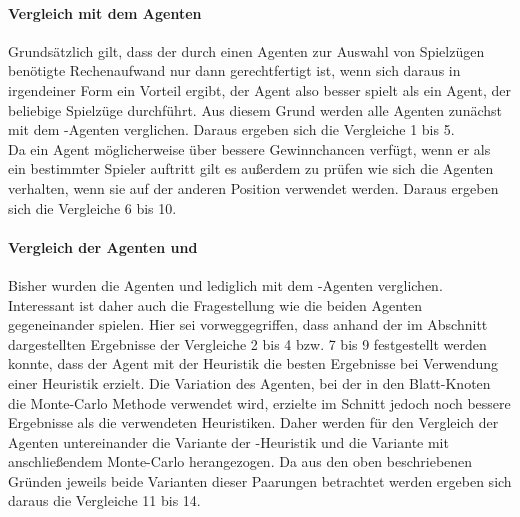 \paragraph{Vergleich mit dem Agenten }
Grundsätzlich gilt, dass der durch einen Agenten zur Auswahl von Spielzügen benötigte Rechenaufwand nur dann gerechtfertigt ist, wenn sich daraus in irgendeiner Form ein Vorteil ergibt, der Agent also besser spielt als ein Agent, der beliebige Spielzüge durchführt. Aus diesem Grund werden alle Agenten zunächst mit dem -Agenten verglichen. Daraus ergeben sich die Vergleiche 1 bis 5.
\\Da ein Agent möglicherweise über bessere Gewinnchancen verfügt, wenn er als ein bestimmter Spieler auftritt gilt es außerdem zu prüfen wie sich die Agenten verhalten, wenn sie auf der anderen Position verwendet werden. Daraus ergeben sich die Vergleiche 6 bis 10. 

\paragraph{Vergleich der Agenten \mxZitat{\abp} und }
Bisher wurden die Agenten \mxZitat{\abp} und  lediglich mit dem -Agenten verglichen. Interessant ist daher auch die Fragestellung wie die beiden Agenten gegeneinander spielen. Hier sei vorweggegriffen, dass anhand der im Abschnitt  dargestellten Ergebnisse der Vergleiche 2 bis 4 bzw. 7 bis 9 festgestellt werden konnte, dass der Agent \mxZitat{\abp} mit der Heuristik  die besten Ergebnisse bei Verwendung einer Heuristik erzielt. Die Variation des Agenten, bei der in den Blatt-Knoten die Monte-Carlo Methode verwendet wird, erzielte im Schnitt jedoch noch bessere Ergebnisse als die verwendeten Heuristiken. Daher werden für den Vergleich der Agenten untereinander die Variante der -Heuristik und die Variante mit anschließendem Monte-Carlo herangezogen. Da aus den oben beschriebenen Gründen jeweils beide Varianten dieser Paarungen betrachtet werden ergeben sich daraus die Vergleiche 11 bis 14.

